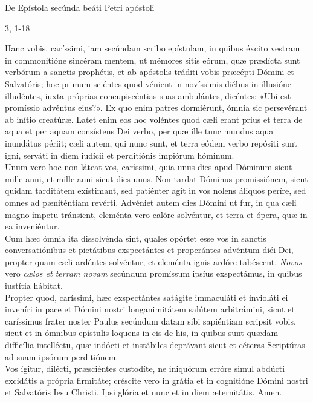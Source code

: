 \documentclass[options]{article}
\begin{document}
	De Epístola secúnda beáti Petri apóstoli
	\begin{flushright}
		3, 1-18	
	\end{flushright}
	Hanc vobis, caríssimi, iam secúndam scribo epístulam, in quibus éxcito vestram in commonitióne sincéram mentem, ut mémores sitis eórum, quæ prædícta sunt verbórum a sanctis prophétis, et ab apóstolis tráditi vobis præcépti Dómini et Salvatóris; hoc primum sciéntes quod vénient in novíssimis diébus in illusióne illudéntes, iuxta próprias concupiscéntias suas ambulántes, dicéntes: «Ubi est promíssio advéntus eius?». Ex quo enim patres dormiérunt, ómnia sic persevérant ab inítio creatúræ. Latet enim eos hoc voléntes quod cæli erant prius et terra de aqua et per aquam consístens Dei verbo, per quæ ille tunc mundus aqua inundátus périit; cæli autem, qui nunc sunt, et terra eódem verbo repósiti sunt igni, serváti in diem iudícii et perditiónis impiórum hóminum.\\
	Unum vero hoc non láteat vos, caríssimi, quia unus dies apud Dóminum sicut mille anni, et mille anni sicut dies unus. Non tardat Dóminus promissiónem, sicut quidam tarditátem exístimant, sed patiénter agit in vos nolens áliquos períre, sed omnes ad pæniténtiam revérti. Advéniet autem dies Dómini ut fur, in qua cæli magno ímpetu tránsient, eleménta vero calóre solvéntur, et terra et ópera, quæ in ea inveniéntur.\\
	Cum hæc ómnia ita dissolvénda sint, quales opórtet esse vos in sanctis conversatiónibus et pietátibus exspectántes et properántes advéntum diéi Dei, propter quam cæli ardéntes solvéntur, et eleménta ignis ardóre tabéscent. \emph{Novos} vero \emph{cælos et terram novam} secúndum promíssum ipsíus exspectámus, in quibus iustítia hábitat.\\
	Propter quod, caríssimi, hæc exspectántes satágite immaculáti et invioláti ei inveníri in pace et Dómini nostri longanimitátem salútem arbitrámini, sicut et caríssimus frater noster Paulus secúndum datam sibi sapiéntiam scripsit vobis, sicut et in ómnibus epístulis loquens in eis de his, in quibus sunt quædam difficília intelléctu, quæ indócti et instábiles deprávant sicut et céteras Scriptúras ad suam ipsórum perditiónem.\\
	Vos ígitur, dilécti, præsciéntes custodíte, ne iniquórum erróre simul abdúcti excidátis a própria firmitáte; créscite vero in grátia et in cognitióne Dómini nostri et Salvatóris Iesu Christi. Ipsi glória et nunc et in diem æternitátis. Amen.\\
	\\
\end{document}
